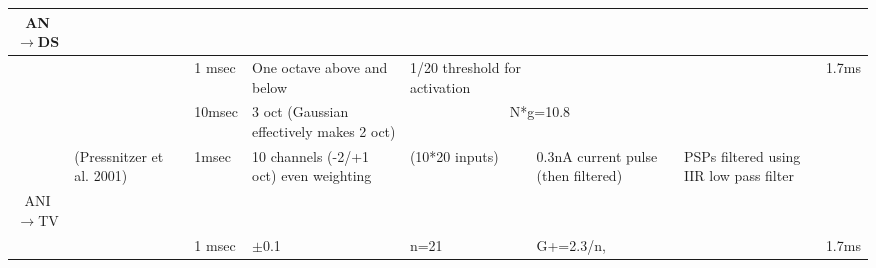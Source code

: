 \begin{longtable}{cXXXXXXX}
 {AN\ensuremath{\rightarrow}DS}  &                                                  &                                                                                                                    &                                                           &                                           &                                                                                             &                                           & \\\midrule
                                 &          {\citep{ErikssonRobert:1999}}           &                                                     {1 msec }                                                      &               {One octave above and below }               &     {1/20 threshold for activation }      &                                                                                             &                                           & 1.7ms \\
                                 &            {\citep{ReissYoung:2005}}             &                                                      {10msec}                                                      &        {3 oct (Gaussian effectively makes 2 oct)}         &                                                      \multicolumn{2}{c}{N*g=10.8}                                                       &                    {}                     & \\ 
                                 &           {(Pressnitzer et al. 2001)}            &                                                      {1msec}                                                       &         {10 channels (-2/+1 oct) even weighting }         &              (10*20 inputs)               &                            {0.3nA current pulse (then filtered)}                            & {PSPs filtered using IIR low pass filter} & \\ 
 ANI\ensuremath{\rightarrow}TV   &                                                  &                                                                                                                    &                                                           &                                           &                                                                                             &                                           & \\\midrule
                                 &           \citep{ErikssonRobert:1999}            &                                                       1 msec                                                       &                         $\pm$0.1                          &                   n=21                    &                                          G+=2.3/n,                                          &                                           & 1.7ms\\ 

\end{longtable}
